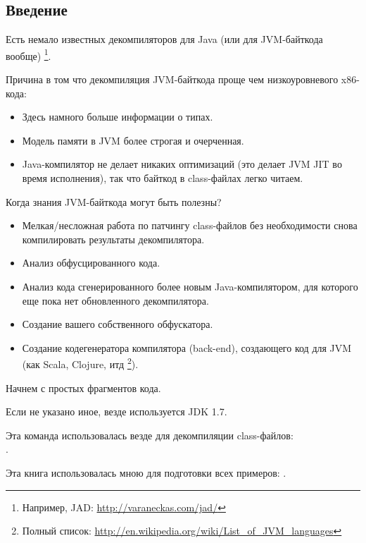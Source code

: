 \subsection{Введение}

\newcommand{\JADURL}{\url{http://varaneckas.com/jad/}}

Есть немало известных декомпиляторов для Java (или для \ac{JVM}-байткода вообще)
\footnote{Например, JAD: \JADURL}.

Причина в том что декомпиляция \ac{JVM}-байткода проще чем низкоуровневого x86-кода:

\begin{itemize}
\item Здесь намного больше информации о типах.
      
\item Модель памяти в \ac{JVM} более строгая и очерченная.
\item Java-компилятор не делает никаких оптимизаций (это делает \ac{JVM} \ac{JIT} во время 
       исполнения), так что байткод в class-файлах легко читаем.
\end{itemize}

Когда знания \ac{JVM}-байткода могут быть полезны?

\newcommand{\URLListOfJVMLangs}{\url{http://en.wikipedia.org/wiki/List_of_JVM_languages}}

\begin{itemize}
\item Мелкая/несложная работа по патчингу class-файлов без необходимости снова компилировать результаты 
      декомпилятора.
\item Анализ обфусцированного кода.
\item Анализ кода сгенерированного более новым Java-компилятором, для которого еще пока нет обновленного декомпилятора.
\item Создание вашего собственного обфускатора.
\item Создание кодегенератора компилятора (back-end), создающего код для \ac{JVM} (как Scala, Clojure, итд
      \footnote{Полный список: \URLListOfJVMLangs}).
\end{itemize}

Начнем с простых фрагментов кода.

Если не указано иное, везде используется JDK 1.7.

Эта команда использовалась везде для декомпиляции class-файлов:\\
.

Эта книга использовалась мною для подготовки всех примеров: \JavaBook.

